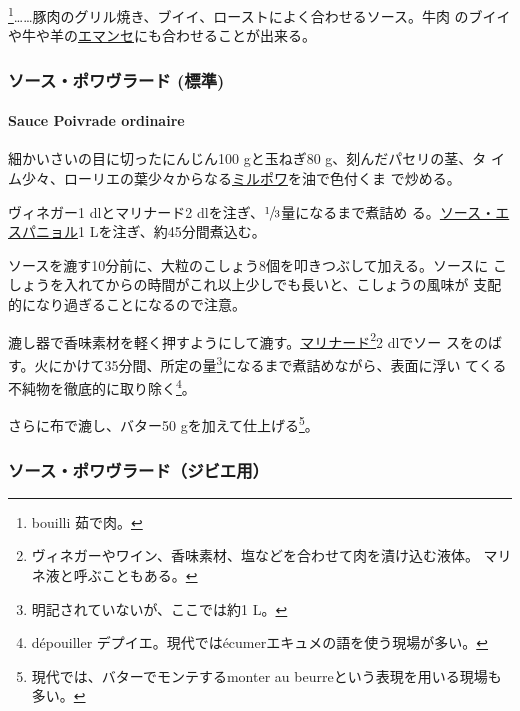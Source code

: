 \footnote{bouilli 茹で肉。}\ldots{}\ldots{}豚肉のグリル焼き、ブイイ、ローストによく合わせるソース。牛肉
のブイイや牛や羊の\href{}{エマンセ}にも合わせることが出来る。

\maeaki

\hypertarget{ux30bdux30fcux30b9ux30ddux30efux30f4ux30e9ux30fcux30c9-ux6a19ux6e96}{%
\subsubsection{ソース・ポワヴラード
(標準)}\label{ux30bdux30fcux30b9ux30ddux30efux30f4ux30e9ux30fcux30c9-ux6a19ux6e96}}

\hypertarget{sauce-poivrade}{%
\paragraph{Sauce Poivrade ordinaire}\label{sauce-poivrade}}


細かいさいの目に切ったにんじん100 gと玉ねぎ80 g、刻んだパセリの茎、タ
イム少々、ローリエの葉少々からなる\protect\hyperlink{mirepoix}{ミルポワ}を油で色付くま
で炒める。

ヴィネガー1 dlとマリナード2 dlを注ぎ、\(\sfrac{1}{3}\)量になるまで煮詰め
る。\protect\hyperlink{sauce-espagnole}{ソース・エスパニョル}1
Lを注ぎ、約45分間煮込む。

ソースを漉す10分前に、大粒のこしょう8個を叩きつぶして加える。ソースに
こしょうを入れてからの時間がこれ以上少しでも長いと、こしょうの風味が
支配的になり過ぎることになるので注意。

漉し器で香味素材を軽く押すようにして漉す。\href{}{マリナード}\footnote{ヴィネガーやワイン、香味素材、塩などを合わせて肉を漬け込む液体。
  マリネ液と呼ぶこともある。}2 dlでソー
スをのばす。火にかけて35分間、所定の量\footnote{明記されていないが、ここでは約1
  L。}になるまで煮詰めながら、表面に浮い
てくる不純物を徹底的に取り除く\footnote{dépouiller
  デプイエ。現代ではécumerエキュメの語を使う現場が多い。}。

さらに布で漉し、バター50 gを加えて仕上げる\footnote{現代では、バターでモンテするmonter
  au beurreという表現を用いる現場も多い。}。

\maeaki

\hypertarget{ux30bdux30fcux30b9ux30ddux30efux30f4ux30e9ux30fcux30c9ux30b8ux30d3ux30a8ux7528}{%
\subsubsection{ソース・ポワヴラード（ジビエ用）}\label{ux30bdux30fcux30b9ux30ddux30efux30f4ux30e9ux30fcux30c9ux30b8ux30d3ux30a8ux7528}}

